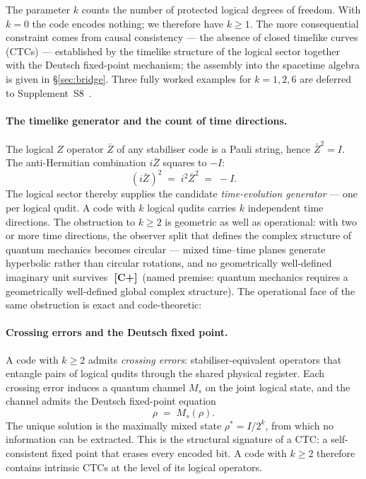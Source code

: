 \documentclass[11pt,a4paper]{article}
\newcommand{\Cpmark}{\textcolor{blue!70!black}{\textbf{[C+]}}}
\begin{document}
The parameter $k$ counts the number of protected logical degrees of freedom. With $k=0$ the code encodes nothing; we therefore have $k\geq1$. The more consequential constraint comes from causal consistency --- the absence of closed timelike curves (CTCs) \cite{Hawking1992, Novikov1989} --- established by the timelike structure of the logical sector together with the Deutsch fixed-point mechanism; the assembly into the spacetime algebra is given in \S\ref{sec:bridge}. Three fully worked examples for $k=1,2,6$ are deferred to Supplement~S8~\cite{Hubka2026QSDSupp}.

\paragraph{The timelike generator and the count of time directions.} The logical $Z$ operator $\bar Z$ of any stabiliser code is a Pauli string, hence $\bar Z^2 = I$. The anti-Hermitian combination $i\bar Z$ squares to $-I$:
\begin{equation}
  (i\bar Z)^2 \;=\; i^2\bar Z^2 \;=\; -I.
  \label{eq:i_zbar}
\end{equation}
The logical sector thereby supplies the candidate \emph{time-evolution generator} --- one per logical qudit. A code with $k$ logical qudits carries $k$ independent time directions. The obstruction to $k\geq2$ is geometric as well as operational: with two or more time directions, the observer split that defines the complex structure of quantum mechanics becomes circular --- mixed time--time planes generate hyperbolic rather than circular rotations, and no geometrically well-defined imaginary unit survives~\cite{Hubka2026CW}\,\Cpmark\ (named premise: quantum mechanics requires a geometrically well-defined global complex structure). The operational face of the same obstruction is exact and code-theoretic:

\paragraph{Crossing errors and the Deutsch fixed point.} A code with $k\geq2$ admits \emph{crossing errors}: stabiliser-equivalent operators that entangle pairs of logical qudits through the shared physical register. Each crossing error induces a quantum channel $M_s$ on the joint logical state, and the channel admits the Deutsch fixed-point equation~\cite{Deutsch1991}
\begin{equation}
  \rho \;=\; M_s(\rho).
  \label{eq:deutsch}
\end{equation}
The unique solution is the maximally mixed state $\rho^* = I/2^k$, from which no information can be extracted. This is the structural signature of a CTC: a self-consistent fixed point that erases every encoded bit. A code with $k\geq2$ therefore contains intrinsic CTCs at the level of its logical operators.
\end{document}

